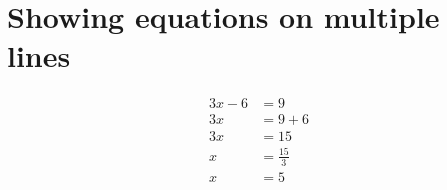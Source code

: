 \documentclass{article}
\begin{document}
	
	\section{Showing equations on multiple lines}
	\paragraph{}
	
	\begin{align}
		3x-6&=9\\
		3x&=9+6\nonumber\\
		3x&=15\nonumber\\
		x&=\frac{15}{3}\nonumber\\
		x&=5\nonumber
	\end{align}
\end{document}
